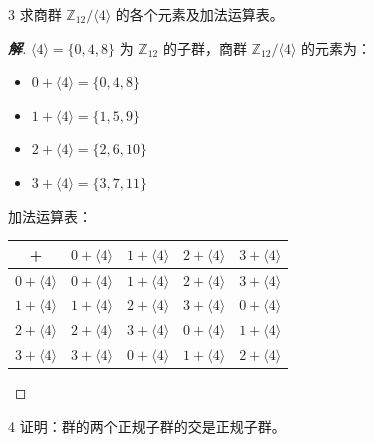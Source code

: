 \documentclass[12pt, a4paper]{article}
\newenvironment{solution}{
    \begin{proof}[\textbf{解}]
}{
    \end{proof}
}
\begin{document}
\begin{problem}{3}
    求商群 $\mathbb{Z}_{12}/\langle 4 \rangle$ 的各个元素及加法运算表。
\end{problem}

\begin{solution}
    $\langle 4 \rangle = \{0, 4, 8\}$ 为 $\mathbb{Z}_{12}$ 的子群，商群 $\mathbb{Z}_{12} / \langle 4 \rangle$ 的元素为：
    \begin{itemize}
        \item $0 + \langle 4 \rangle = \{0, 4, 8\}$
        \item $1 + \langle 4 \rangle = \{1, 5, 9\}$
        \item $2 + \langle 4 \rangle = \{2, 6, 10\}$
        \item $3 + \langle 4 \rangle = \{3, 7, 11\}$
    \end{itemize}

    加法运算表：
    \begin{table}[h]
        \centering
        \begin{tabular}{c|cccc}
            + & $0 + \langle 4 \rangle$ & $1 + \langle 4 \rangle$ & $2 + \langle 4 \rangle$ & $3 + \langle 4 \rangle$ \\ \hline
            $0 + \langle 4 \rangle$ & $0 + \langle 4 \rangle$ & $1 + \langle 4 \rangle$ & $2 + \langle 4 \rangle$ & $3 + \langle 4 \rangle$ \\
            $1 + \langle 4 \rangle$ & $1 + \langle 4 \rangle$ & $2 + \langle 4 \rangle$ & $3 + \langle 4 \rangle$ & $0 + \langle 4 \rangle$ \\
            $2 + \langle 4 \rangle$ & $2 + \langle 4 \rangle$ & $3 + \langle 4 \rangle$ & $0 + \langle 4 \rangle$ & $1 + \langle 4 \rangle$ \\
            $3 + \langle 4 \rangle$ & $3 + \langle 4 \rangle$ & $0 + \langle 4 \rangle$ & $1 + \langle 4 \rangle$ & $2 + \langle 4 \rangle$
        \end{tabular}
    \end{table}
\end{solution}
    
\begin{problem}{4}
    证明：群的两个正规子群的交是正规子群。
\end{problem}
\end{document}
